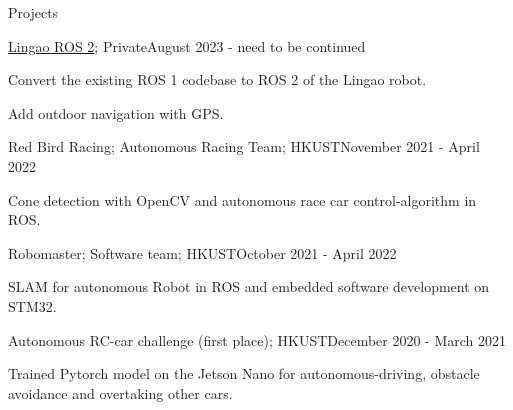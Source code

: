 \documentclass[
	a4paper, %
	11pt, %
]{resume} %
\begin{document}
\begin{rSection}{Projects}

	\begin{rSubsection}{\href{https://github.com/JosefGst/lingao_ros2}{Lingao ROS 2}; Private}{August 2023 - need to be continued}{}{}
		\item Convert the existing ROS 1 codebase to ROS 2 of the Lingao robot.
		\item Add outdoor navigation with GPS.
	\end{rSubsection}


	\begin{rSubsection}{Red Bird Racing; Autonomous Racing Team; HKUST}{November 2021 - April 2022}{}{}
		\item Cone detection with OpenCV and autonomous race car control-algorithm in ROS.
	\end{rSubsection}


	\begin{rSubsection}{Robomaster; Software team; HKUST}{October 2021 - April 2022}{}{}
		\item SLAM for autonomous Robot in ROS and embedded software development on STM32.
	\end{rSubsection}


	\begin{rSubsection}{Autonomous RC-car challenge (first place); HKUST}{December 2020 - March 2021}{}{}
		\item Trained Pytorch model on the Jetson Nano for autonomous-driving, obstacle avoidance and overtaking other cars.
	\end{rSubsection}

\end{rSection}






\end{document}
